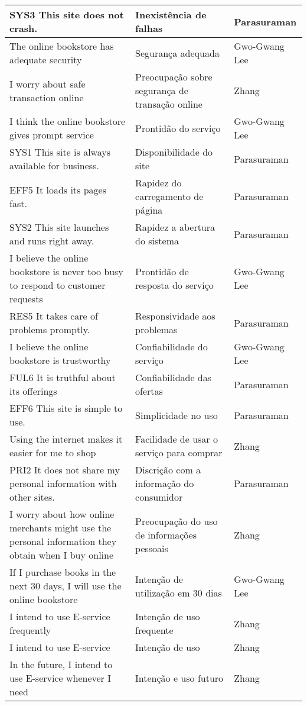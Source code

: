 \begin{apendicesenv}
\begin{table}[]
{\begin{tabular}{|lll|}
SYS3 This site does not crash. & Inexistência de falhas & Parasuraman \\ \hline
The online bookstore has adequate security & Segurança adequada & Gwo-Gwang Lee \\
I worry about safe transaction online & Preocupação sobre segurança de transação online & Zhang \\ \hline
I think the online bookstore gives prompt service & Prontidão do serviço & Gwo-Gwang Lee \\
SYS1 This site is always available for business. & Disponibilidade do site & Parasuraman \\ \hline
EFF5 It loads its pages fast. & Rapidez do carregamento de página & Parasuraman \\
SYS2 This site launches and runs right away. & Rapidez a abertura do sistema & Parasuraman \\ \hline
I believe the online bookstore is never too busy to respond to customer requests & Prontidão de resposta do serviço & Gwo-Gwang Lee \\
RES5 It takes care of problems promptly. & Responsividade aos problemas & Parasuraman \\ \hline
I believe the online bookstore is trustworthy & Confiabilidade do serviço & Gwo-Gwang Lee \\
FUL6 It is truthful about its offerings & Confiabilidade das ofertas & Parasuraman \\ \hline
EFF6 This site is simple to use. & Simplicidade no uso & Parasuraman \\
Using the internet makes it easier for me to shop & Facilidade de usar o serviço para comprar & Zhang \\ \hline
PRI2 It does not share my personal information with other sites. & Discrição com a informação do consumidor & Parasuraman \\
I worry about how online merchants might use the personal information they obtain when I buy online & Preocupação do uso de informações pessoais & Zhang \\ \hline
If I purchase books in the next 30 days, I will use the online bookstore & Intenção de utilização em 30 dias & Gwo-Gwang Lee \\
I intend to use E-service frequently & Intenção de uso frequente & Zhang \\
I intend to use E-service & Intenção de uso & Zhang \\
In the future, I intend to use E-service whenever I need & Intenção e uso futuro & Zhang \\ \hline

\end{tabular}}
\end{table}
\end{apendicesenv}
